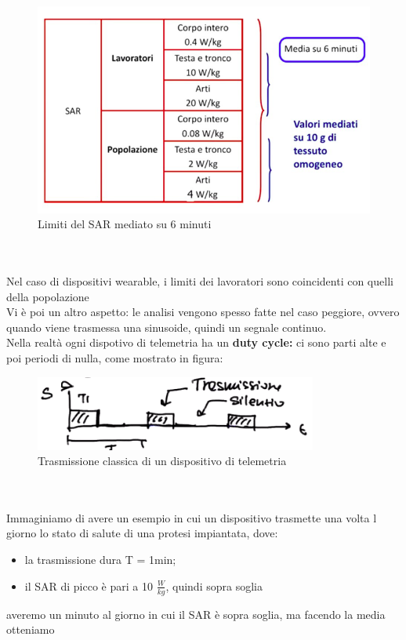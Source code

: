 \documentclass[oneside, 12pt]{extbook}
\begin{document}
\begin{figure}
	\includegraphics[scale=0.5]{immagini/limiti_sar.png}
	\caption{Limiti del SAR mediato su 6 minuti}
\end{figure}
\\\\Nel caso di dispositivi wearable, i limiti dei lavoratori sono coincidenti con quelli della popolazione\\Vi è poi un altro aspetto: le analisi vengono spesso fatte nel caso peggiore, ovvero quando viene trasmessa una sinusoide, quindi un segnale continuo.\\Nella realtà ogni dispotivo di telemetria ha un \textbf{duty cycle:} ci  sono parti alte e poi periodi di nulla, come mostrato in figura:
\begin{figure}[!h]
	\includegraphics[scale=0.7]{immagini/duty_cycle.png}
	\caption{Trasmissione classica di un dispositivo di telemetria}
\end{figure}
\\\\Immaginiamo di avere un esempio in cui un dispositivo trasmette una volta l giorno lo stato di salute di una protesi impiantata, dove:
\begin{itemize}
	\item la trasmissione dura T = 1min;
	\item il SAR di picco è pari a 10 $\frac{W}{kg}$, quindi sopra soglia
\end{itemize}
averemo un minuto al giorno in cui il SAR è sopra soglia, ma facendo la media otteniamo 
\end{document}
